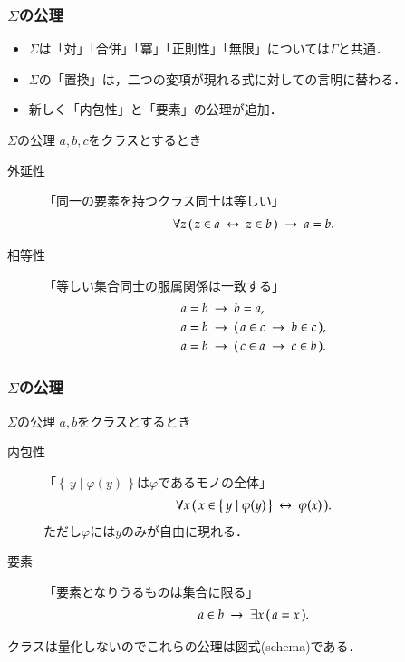 \documentclass[dvipdfmx,10pt,notheorems]{beamer}
\theoremstyle{definition}
\newcommand{\Set}[2]{\left\{\, #1 \mid #2\, \right\}} %
\newcommand{\rarrow}{\hspace{0.25em}\rightarrow\hspace{0.25em}} %
\newcommand{\lrarrow}{\hspace{0.25em}\leftrightarrow\hspace{0.25em}} %
\begin{document}
\begin{frame}\frametitle{$\Sigma$の公理}
	\begin{itemize}
		\item $\Sigma$は「対」「合併」「冪」「正則性」「無限」については$\Gamma$と共通．
		\item $\Sigma$の「置換」は，二つの変項が現れる式に対しての言明に替わる．
		\item 新しく「内包性」と「要素」の公理が追加．
	\end{itemize}
	
	\begin{alertblock}{$\Sigma$の公理}
		$a,b,c$をクラスとするとき
		\begin{description}
			\item[外延性] 「同一の要素を持つクラス同士は等しい」
				\begin{align}
					\forall z\, (\, z \in a \lrarrow z \in b\, ) \rarrow a = b.
				\end{align}
			\item[相等性] 「等しい集合同士の服属関係は一致する」
				\begin{align}
					&a = b \rarrow b = a, \\
					&a = b \rarrow (\, a \in c \rarrow b \in c\, ), \\
					&a = b \rarrow (\, c \in a \rarrow c \in b\, ).
				\end{align}
		\end{description}	
	\end{alertblock}
\end{frame}

\begin{frame}\frametitle{$\Sigma$の公理}
	
	\begin{alertblock}{$\Sigma$の公理}
		$a,b$をクラスとするとき
		\begin{description}
			\item[内包性] 「$\Set{y}{\varphi(y)}$は$\varphi$であるモノの全体」
				\begin{align}
					\forall x\, (\, x \in \Set{y}{\varphi(y)} \lrarrow \varphi(x)\, ).
				\end{align}
				ただし$\varphi$には$y$のみが自由に現れる．
				
			\item[要素] 「要素となりうるものは集合に限る」
				\begin{align}
					a \in b \rarrow \exists x\, (\, a = x\, ).
				\end{align}
		\end{description}	
	\end{alertblock}	
	クラスは量化しないのでこれらの公理は図式(schema)である．	
\end{frame}
\end{document}
